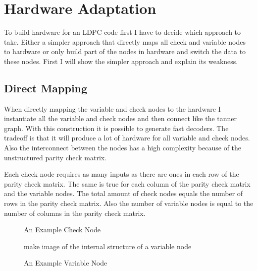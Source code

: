 \section{Hardware Adaptation}
To build hardware for an LDPC code first I have to decide which approach to take. Either a simpler approach that directly maps all check and variable nodes to hardware or only build part of the nodes in hardware and switch the data to these nodes. First I will show the simpler approach and explain its weakness.

\subsection{Direct Mapping}
When directly mapping the variable and check nodes to the hardware I instantiate all the variable and check nodes and then connect like the tanner graph. With this construction it is possible to generate fast decoders. The tradeoff is that it will produce a lot of hardware for all variable and check nodes. Also the interconnect between the nodes has a high complexity because of the unstructured parity check matrix.

Each check node requires as many inputs as there are ones in each row of the parity check matrix. The same is true for each column of the parity check matrix and the variable nodes. The total amount of check nodes equals the number of rows in the parity check matrix. Also the number of variable nodes is equal to the number of columns in the parity check matrix.

\begin{figure}
    \centering
    \caption{An Example Check Node}
\end{figure}

\begin{figure}
    make image of the internal structure of a variable node
    \centering
    \caption{An Example Variable Node}
\end{figure}

